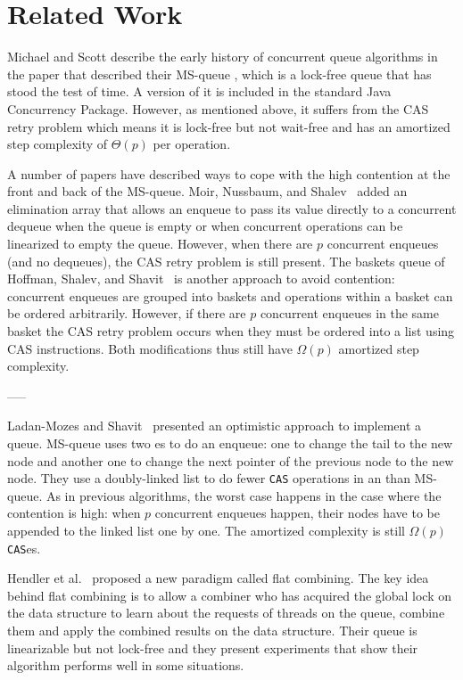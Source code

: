 
\section{Related Work}

Michael and Scott \cite{DBLP:conf/podc/MichaelS96} describe the early history of concurrent queue algorithms
in the paper that described their MS-queue \cite{DBLP:conf/podc/MichaelS96}, which
is a lock-free queue that has stood the test of time.
A version of it is
included in the standard Java Concurrency Package.  %
However, as mentioned above, it suffers from the CAS retry problem
which means it is lock-free but not wait-free and has an amortized step complexity
of $\Theta(p)$ per operation.

A number of papers have described ways to cope with the high contention at the front
and back of the MS-queue.
Moir, Nussbaum, and Shalev~\cite{DBLP:conf/spaa/MoirNSS05} 
added an elimination array that allows an enqueue to pass its value directly
to a concurrent dequeue when the queue is empty or when concurrent operations 
can be linearized to empty the queue.
However, when there are $p$ concurrent enqueues (and no dequeues), the CAS retry problem
is still present.
The baskets queue of
Hoffman, Shalev, and Shavit~\cite{DBLP:conf/opodis/HoffmanSS07} 
is another approach to avoid contention:  concurrent enqueues are grouped into baskets
and operations within a basket can be ordered arbitrarily.
However, if there are $p$ concurrent enqueues in the same basket
the CAS retry problem occurs when they must be ordered into a list using CAS instructions.
Both modifications thus still have $\Omega(p)$ amortized step complexity.

-----

Ladan-Mozes and Shavit~\cite{DBLP:journals/dc/Ladan-MozesS08}
presented an optimistic approach to implement a queue. MS-queue uses
two es to do an enqueue: one to change the tail to the new
node and another one to change the next pointer of the previous node
to the new node. They use a doubly-linked list to do fewer
\texttt{CAS} operations in an  than MS-queue. As in
previous algorithms, the worst case happens in the case where the
contention is high: when $p$ concurrent enqueues happen, their nodes
have to be appended to the linked list one by one. The amortized
complexity is still $\Omega(p)$ \texttt{CAS}es. 

Hendler et al.~\cite{DBLP:conf/spaa/HendlerIST10} proposed a new
paradigm called flat combining. The key idea behind flat combining is
to allow a combiner who has acquired the global lock on the data
structure to learn about the requests of threads on the queue, combine
them and apply the combined results on the data structure. Their queue
is linearizable but not lock-free and they present experiments that
show their algorithm performs well in some situations. 


